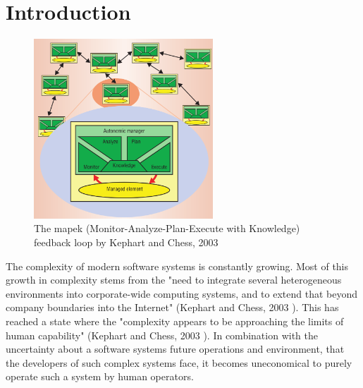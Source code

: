\section{Introduction}
\label{ch:Introduction}


\begin{figure}[hbt!]
    \centering
    \includegraphics[width=0.6\textwidth]{images/MAPEK.png}
    \caption{The \acrshort{mapek} (Monitor-Analyze-Plan-Execute with Knowledge) feedback loop by Kephart and Chess, 2003 \cite*{VisionOfAutonomicComputing}}
    \label{fig:MAPEK}
\end{figure}

The complexity of modern software systems is constantly growing.
Most of this growth in complexity stems from the
"need to integrate several heterogeneous environments into corporate-wide computing systems,
and to extend that beyond company boundaries into the Internet" (Kephart and Chess, 2003 \cite*{VisionOfAutonomicComputing}).
This has reached a state where the
"complexity appears to be approaching the limits of human capability" (Kephart and Chess, 2003 \cite*{VisionOfAutonomicComputing}).
In combination with the uncertainty about a software systems future operations and environment,
that the developers of such complex systems face, it becomes uneconomical to purely operate such a system by human operators.

